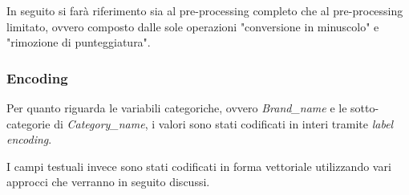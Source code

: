 In seguito si farà riferimento sia al pre-processing completo che al pre-processing
limitato, ovvero composto dalle sole operazioni "conversione in minuscolo" e
"rimozione di punteggiatura".

\subsubsection{Encoding}

Per quanto riguarda le variabili categoriche, ovvero \textit{Brand\_name} e le
sotto-categorie di \textit{Category\_name},
i valori sono stati codificati in interi tramite \textit{label encoding}.

I campi testuali invece sono stati codificati in forma vettoriale utilizzando
vari approcci che verranno in seguito discussi.


